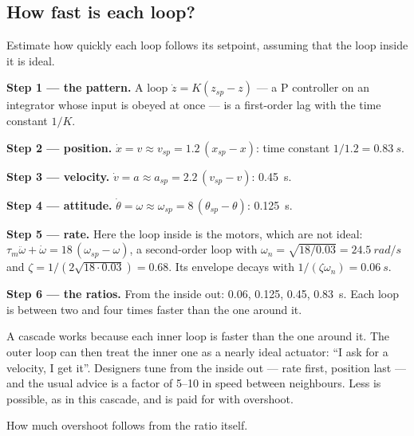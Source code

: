 \subsection{How fast is each loop?}

\begin{example}
\label{ex:cascade-scales}
Estimate how quickly each loop follows its setpoint, assuming that the loop inside it is ideal.

\textbf{Step 1 — the pattern.} A loop $\dot z = K(z_{sp} - z)$ — a P controller on an integrator whose input is obeyed at once — is a first-order lag with the time constant $1/K$.

\textbf{Step 2 — position.} $\dot x = v \approx v_{sp} = 1.2\,(x_{sp} - x)$: time constant $1/1.2 = \SI{0.83}{s}$.

\textbf{Step 3 — velocity.} $\dot v = a \approx a_{sp} = 2.2\,(v_{sp} - v)$: \SI{0.45}{s}.

\textbf{Step 4 — attitude.} $\dot\theta = \omega \approx \omega_{sp} = 8\,(\theta_{sp} - \theta)$: \SI{0.125}{s}.

\textbf{Step 5 — rate.} Here the loop inside is the motors, which are not ideal: $\tau_m\ddot\omega + \dot\omega = 18\,(\omega_{sp} - \omega)$, a second-order loop with $\omega_n = \sqrt{18/0.03} = \SI{24.5}{rad/s}$ and $\zeta = 1/(2\sqrt{18 \cdot 0.03}) = 0.68$. Its envelope decays with $1/(\zeta\omega_n) = \SI{0.06}{s}$.

\textbf{Step 6 — the ratios.} From the inside out: 0.06, 0.125, 0.45, \SI{0.83}{s}. Each loop is between two and four times faster than the one around it.
\end{example}

\begin{keyidea}
A cascade works because each inner loop is faster than the one around it. The outer loop can then treat the inner one as a nearly ideal actuator: \enquote{I ask for a velocity, I get it}. Designers tune from the inside out — rate first, position last — and the usual advice is a factor of 5–10 in speed between neighbours. Less is possible, as in this cascade, and is paid for with overshoot.
\end{keyidea}

How much overshoot follows from the ratio itself.


